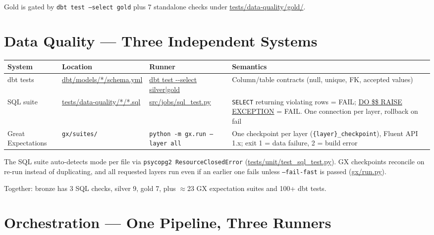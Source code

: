 \documentclass[11pt,a4paper]{article}
\begin{document}
Gold is gated by \texttt{dbt test --select gold} plus 7 standalone checks under \url{tests/data-quality/gold/}.

\section{Data Quality — Three Independent Systems}

\begin{center}
\begin{longtable}{>{\raggedright\arraybackslash}p{2.4cm} >{\raggedright\arraybackslash}p{3.4cm} >{\raggedright\arraybackslash}p{2.4cm} >{\raggedright\arraybackslash}p{5.8cm}}
\toprule
System & Location & Runner & Semantics \\
\midrule
\endhead
dbt tests & \url{dbt/models/*/schema.yml} & \url{dbt test --select silver|gold} & Column/table contracts (null, unique, FK, accepted values) \\
SQL suite & \url{tests/data-quality/*/*.sql} & \url{src/jobs/sql_test.py} & \texttt{SELECT} returning violating rows = FAIL; \url{DO $$ RAISE EXCEPTION} = FAIL. One connection per layer, rollback on fail \\
Great Expectations & \texttt{gx/suites/} & \texttt{python -m gx.run --layer all} & One checkpoint per layer (\texttt{\{layer\}\_checkpoint}), Fluent API 1.x; exit 1 = data failure, 2 = build error \\
\bottomrule
\end{longtable}
\end{center}

The SQL suite auto-detects mode per file via \texttt{psycopg2 ResourceClosedError} (\url{tests/unit/test_sql_test.py}). GX checkpoints reconcile on re-run instead of duplicating, and all requested layers run even if an earlier one fails unless \texttt{--fail-fast} is passed (\url{gx/run.py}).

Together: bronze has 3 SQL checks, silver 9, gold 7, plus $\approx$23 GX expectation suites and 100+ dbt tests.

\section{Orchestration — One Pipeline, Three Runners}
\end{document}
